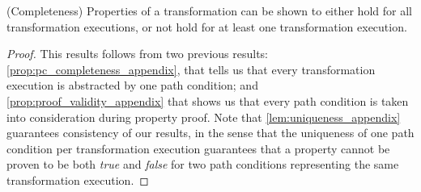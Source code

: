 \begin{pf}

\end{pf}


\begin{proposition}{(Completeness) Properties of a transformation can be shown to either hold for all transformation executions, or not hold for at least one transformation execution.}
\label{prop:proof_completeness_appendix}
\end{proposition}
\begin{proof}
This results follows from two previous results: \cref{prop:pc_completeness_appendix}, that tells us that every transformation execution is abstracted by one path condition; and \cref{prop:proof_validity_appendix} that shows us that every path condition is taken into consideration during property proof. Note that \cref{lem:uniqueness_appendix} guarantees consistency of our results, in the sense that the uniqueness of one path condition per transformation execution guarantees that a property cannot be proven to be both \emph{true} and \emph{false} for two path conditions representing the same transformation execution.
\end{proof}

\clearpage
